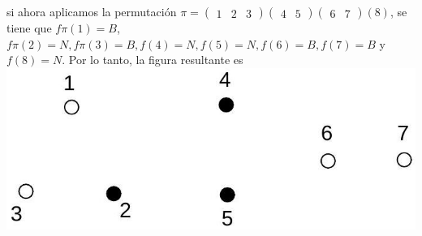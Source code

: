 \documentclass[10pt]{article}
\begin{document}
si ahora aplicamos la permutación $\pi=\left(\begin{array}{lll}1 & 2 & 3\end{array}\right)\left(\begin{array}{ll}4 & 5\end{array}\right)\left(\begin{array}{ll}6 & 7\end{array}\right)(8)$, se tiene que $f \pi(1)=B$, $f \pi(2)=N, f \pi(3)=B, f(4)=N, f(5)=N, f(6)=B, f(7)=B$ y $f(8)=N$. Por lo tanto, la figura resultante es\\
\includegraphics[max width=\textwidth, center]{2025_09_05_3ba26226ec0baddb5a03g-54(1)}\\
\end{document}

